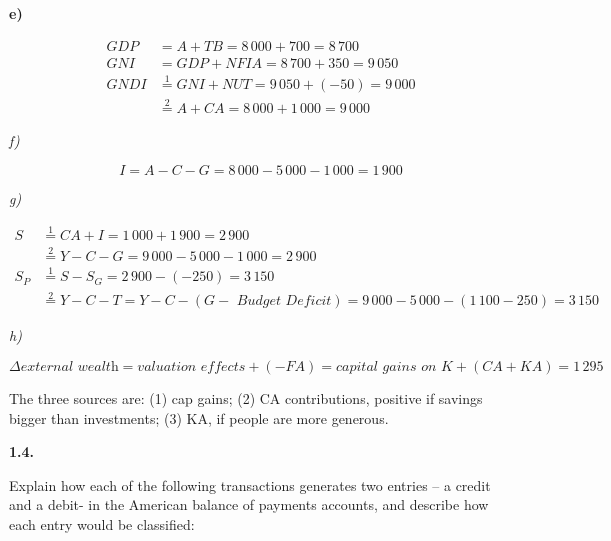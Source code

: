 \documentclass[11pt, a4paper]{article}
\begin{document}
\textbf{e)}

\begin{align*}
   GDP &= A + TB = 8\,000 + 700 = 8\,700 \\
   GNI &= GDP + NFIA = 8\,700 + 350 = 9\,050\\
   GNDI &\overset{1}{=} GNI + NUT = 9\,050 + (-50) = 9\,000\\
   &\overset{2}{=} A + CA = 8\,000+1\,000 = 9\,000
\end{align*}

\textit{f)}

$$ I = A - C - G = 8\,000-5\,000-1\,000 = 1\,900$$

\textit{g)}

\begin{align*}
   S &\overset{1}{=} CA + I = 1\,000 + 1\,900 = 2\,900 \\
   &\overset{2}{=} Y - C - G = 9\,000 - 5\,000 - 1\,000 = 2\,900\\
   S_P &\overset{1}{=} S - S_G = 2\,900 - (-250) = 3\,150\\
   &\overset{2}{=} Y -C-T=Y-C-(G-\textit{ Budget Deficit}) = 9\,000-5\,000 - (1\,100 - 250) = 3\,150
\end{align*}

\textit{h)}

$$\Delta \textit{external wealth} = \textit{valuation effects} + (-FA) =  \textit{capital gains on K} + (CA + KA) = 1\,295$$

The three sources are: (1) cap gains; (2) CA contributions, positive if savings bigger than investments; (3) KA, if people are more generous.

\clearpage

\textbf{1.4.}

Explain how each of the following transactions generates two entries – a credit and a debit- in the American balance of payments accounts, and describe how each entry would be classified:
\end{document}
